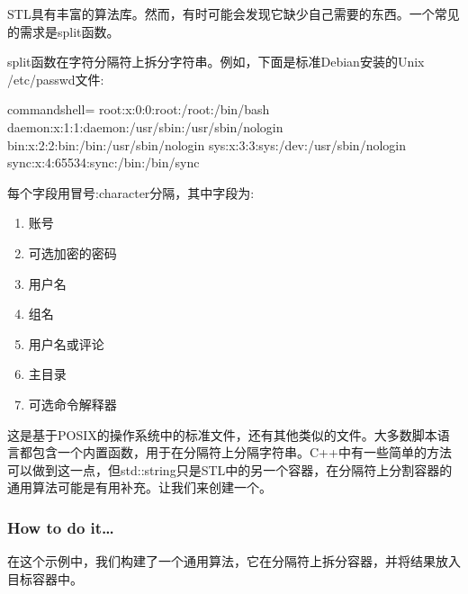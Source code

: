 
STL具有丰富的算法库。然而，有时可能会发现它缺少自己需要的东西。一个常见的需求是split函数。

split函数在字符分隔符上拆分字符串。例如，下面是标准Debian安装的Unix /etc/passwd文件:

\begin{tcblisting}{commandshell={}}
root:x:0:0:root:/root:/bin/bash
daemon:x:1:1:daemon:/usr/sbin:/usr/sbin/nologin
bin:x:2:2:bin:/bin:/usr/sbin/nologin
sys:x:3:3:sys:/dev:/usr/sbin/nologin
sync:x:4:65534:sync:/bin:/bin/sync
\end{tcblisting}

每个字段用冒号:character分隔，其中字段为:


\begin{enumerate}
\item 
账号

\item 
可选加密的密码

\item 
用户名

\item 
组名

\item 
用户名或评论

\item 
主目录

\item 
可选命令解释器
\end{enumerate}

这是基于POSIX的操作系统中的标准文件，还有其他类似的文件。大多数脚本语言都包含一个内置函数，用于在分隔符上分隔字符串。C++中有一些简单的方法可以做到这一点，但std::string只是STL中的另一个容器，在分隔符上分割容器的通用算法可能是有用补充。让我们来创建一个。

\subsubsection{How to do it…}

在这个示例中，我们构建了一个通用算法，它在分隔符上拆分容器，并将结果放入目标容器中。

